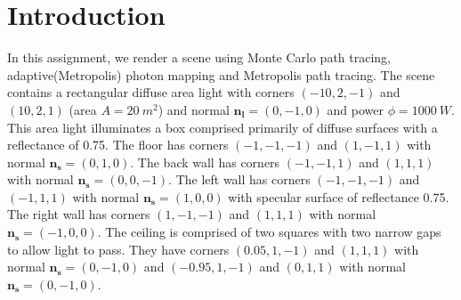\section*{Introduction}
In this assignment, we render a scene using Monte Carlo path tracing, adaptive(Metropolis) photon mapping and Metropolis path tracing. The scene contains a rectangular diffuse area light with corners $(-10,2,-1)$ and $(10,2,1)$ (area $A=20\ m^2$) and normal $\mathbf{n_l}=(0,-1,0)$ and power $\phi=1000\ W$. This area light illuminates a box comprised primarily of diffuse surfaces with a reflectance of 0.75. The floor has corners $(-1,-1,-1)$ and $(1,-1,1)$ with normal $\mathbf{n_s}=(0,1,0)$. The back wall has corners $(-1,-1,1)$ and $(1,1,1)$ with normal $\mathbf{n_s}=(0,0,-1)$. The left wall has corners $(-1,-1,-1)$ and $(-1,1,1)$ with normal $\mathbf{n_s}=(1,0,0)$ with specular surface of reflectance 0.75. The right wall has corners $(1,-1,-1)$ and $(1,1,1)$ with normal $\mathbf{n_s}=(-1,0,0)$. The ceiling is comprised of two squares with two narrow gaps to allow light to pass. They have corners $(0.05,1,-1)$ and $(1,1,1)$ with normal $\mathbf{n_s}=(0,-1,0)$ and $(-0.95,1,-1)$ and $(0,1,1)$ with normal $\mathbf{n_s}=(0,-1,0)$. 
